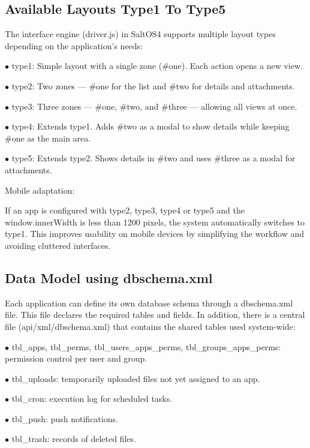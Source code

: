 \documentclass[a4paper]{article}
\begin{document}
\hypertarget{toc38}{}
\subsection{Available Layouts Type1 To Type5}

The interface engine (driver.js) in SaltOS4 supports multiple layout types depending on the application’s needs:

\begin{compactitem}
\item[\color{myblue}$\bullet$] type1: Simple layout with a single zone (\#one). Each action opens a new view.
\item[\color{myblue}$\bullet$] type2: Two zones — \#one for the list and \#two for details and attachments.
\item[\color{myblue}$\bullet$] type3: Three zones — \#one, \#two, and \#three — allowing all views at once.
\item[\color{myblue}$\bullet$] type4: Extends type1. Adds \#two as a modal to show details while keeping \#one as the main area.
\item[\color{myblue}$\bullet$] type5: Extends type2. Shows details in \#two and uses \#three as a modal for attachments.
\end{compactitem}

Mobile adaptation:

If an app is configured with type2, type3, type4 or type5 and the window.innerWidth is less than 1200 pixels, the system automatically switches to type1. This improves usability on mobile devices by simplifying the workflow and avoiding cluttered interfaces.

\hypertarget{toc39}{}
\subsection{Data Model using dbschema.xml}

Each application can define its own database schema through a dbschema.xml file. This file declares the required tables and fields. In addition, there is a central file (api/xml/dbschema.xml) that contains the shared tables used system-wide:

\begin{compactitem}
\item[\color{myblue}$\bullet$] tbl\_apps, tbl\_perms, tbl\_users\_apps\_perms, tbl\_groups\_apps\_perms: permission control per user and group.
\item[\color{myblue}$\bullet$] tbl\_uploads: temporarily uploaded files not yet assigned to an app.
\item[\color{myblue}$\bullet$] tbl\_cron: execution log for scheduled tasks.
\item[\color{myblue}$\bullet$] tbl\_push: push notifications.
\item[\color{myblue}$\bullet$] tbl\_trash: records of deleted files.
\end{compactitem}
\end{document}
